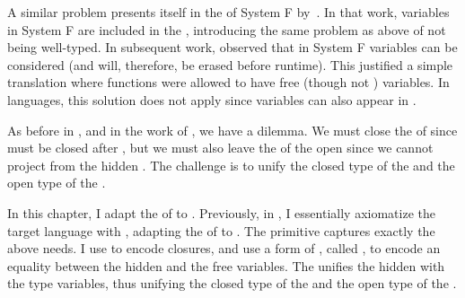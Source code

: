A similar problem presents itself in the   of System F by~\citet{minamide1996}.
In that work,  variables in System F are included in the
, introducing the same problem as above of  not
being well-typed.
In subsequent work, \citet{morrisett1998:ftotal} observed that in System F
 variables can be considered  (and will,
therefore, be erased before runtime).
This justified a simple translation where  functions
were allowed to have free  (though not ) variables.
In  languages, this solution does not apply since
 variables can also appear in .

As before in , and in the work of \citet{minamide1996}, we
have a dilemma.
We must close the  of  since  must be closed
after , but we must also leave the  of
the  open since we cannot project from the
hidden .
The challenge is to unify the closed type of the  and the open type of
the .

In this chapter, I adapt the  of
\citet{minamide1996} to .
Previously, in , I essentially axiomatize the target language
with , adapting the 
of \citet{minamide1996} to .
The primitive  captures exactly the above needs.
I use  to encode closures, and use a form
of , called , to encode an
equality between the hidden  and the free variables.
The  unifies the hidden  with the type
variables, thus unifying the closed type of the  and the open type
of the .

